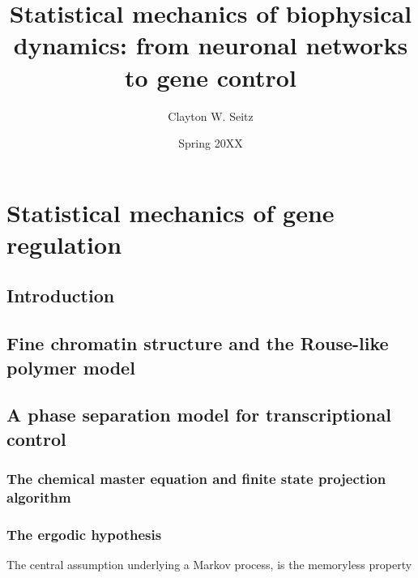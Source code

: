 \documentclass{ucetd}
\title{Statistical mechanics of biophysical dynamics: from neuronal networks to gene control}
\author{Clayton W. Seitz}
\date{Spring 20XX}
\begin{document}
\maketitle

\makecopyright


\tableofcontents


\abstract



\clearpage

\mainmatter

\chapter{Statistical mechanics of gene regulation}

\section{Introduction}

\section{Fine chromatin structure and the Rouse-like polymer model}

\section{A phase separation model for transcriptional control}

\subsection{The chemical master equation and finite state projection algorithm}

\subsection{The ergodic hypothesis}



The central assumption underlying a Markov process, is the memoryless property
\end{document}
